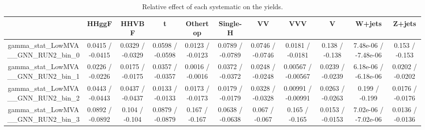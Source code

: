 \documentclass[10pt]{article}
\begin{document}
\begin{table}[htbp]
\begin{center}
\begin{tabular}{|c|c|c|c|c|c|c|c|c|c|c|}
\hline 
      & HHggF      & HHVBF      & t      & Othertop      & Single-H      & VV      & VVV      & V      & W+jets      & Z+jets \\ 
\hline 
  gamma_stat_LowMVA__GNN_RUN2_bin_0 & 0.0415 / -0.0415 & 0.0329 / -0.0329 & 0.0598 / -0.0598 & 0.0123 / -0.0123 & 0.0789 / -0.0789 & 0.0746 / -0.0746 & 0.0181 / -0.0181 & 0.138 / -0.138 & 7.48e-06 / -7.48e-06 & 0.153 / -0.153 \\ 
  gamma_stat_LowMVA__GNN_RUN2_bin_1 & 0.0226 / -0.0226 & 0.0175 / -0.0175 & 0.0357 / -0.0357 & 0.0016 / -0.0016 & 0.0372 / -0.0372 & 0.0248 / -0.0248 & 0.00567 / -0.00567 & 0.0239 / -0.0239 & 6.18e-06 / -6.18e-06 & 0.0202 / -0.0202 \\ 
  gamma_stat_LowMVA__GNN_RUN2_bin_2 & 0.0443 / -0.0443 & 0.0437 / -0.0437 & 0.0133 / -0.0133 & 0.0173 / -0.0173 & 0.0179 / -0.0179 & 0.0328 / -0.0328 & 0.00991 / -0.00991 & 0.0263 / -0.0263 & 0.199 / -0.199 & 0.0176 / -0.0176 \\ 
  gamma_stat_LowMVA__GNN_RUN2_bin_3 & 0.0892 / -0.0892 & 0.104 / -0.104 & 0.0879 / -0.0879 & 0.167 / -0.167 & 0.0638 / -0.0638 & 0.067 / -0.067 & 0.165 / -0.165 & 0.0153 / -0.0153 & 7.02e-06 / -7.02e-06 & 0.0136 / -0.0136 \\ 
\hline 
\end{tabular} 
\caption{Relative effect of each systematic on the yields.} 
\end{center} 
\end{table} 
\end{document}
